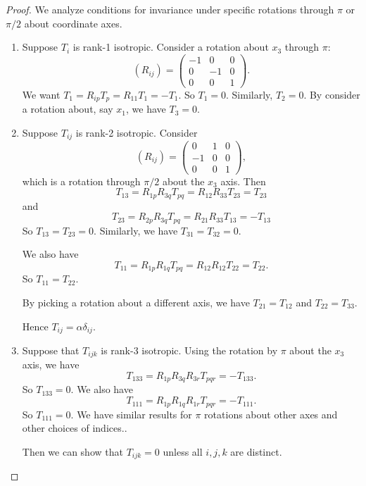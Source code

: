 \documentclass[a4paper]{article}
\begin{document}
\begin{proof}
  We analyze conditions for invariance under specific rotations through $\pi$ or $\pi/2$ about coordinate axes.

  \begin{enumerate}
    \item Suppose $T_i$ is rank-1 isotropic. Consider a rotation about $x_3$ through $\pi$:
      \[
        (R_{ij}) = 
        \begin{pmatrix}
          -1 & 0 & 0\\
          0 & -1 & 0\\
          0 & 0 & 1
        \end{pmatrix}.
      \]
      We want $T_1 = R_{ip}T_p = R_{11} T_1 = -T_1$. So $T_1 = 0$. Similarly, $T_2 = 0$. By consider a rotation about, say $x_1$, we have $T_3 = 0$.
    \item Suppose $T_{ij}$ is rank-2 isotropic. Consider
      \[
        (R_{ij}) = 
        \begin{pmatrix}
          0 & 1 & 0\\
          -1 & 0 & 0\\
          0 & 0 & 1
        \end{pmatrix},
      \]
      which is a rotation through $\pi/2$ about the $x_3$ axis. Then
      \[
        T_{13} = R_{1p}R_{3q} T_{pq} = R_{12}R_{33}T_{23} = T_{23}
      \]
      and
      \[
        T_{23} = R_{2p}R_{3q} T_{pq} = R_{21}R_{33}T_{13} = -T_{13}
      \]
      So $T_{13} = T_{23} = 0$. Similarly, we have $T_{31} = T_{32} = 0$.

      We also have
      \[
        T_{11} = R_{1p} R_{1q} T_{pq} = R_{12} R_{12}T_{22} = T_{22}.
      \]
      So $T_{11} = T_{22}$.

      By picking a rotation about a different axis, we have $T_{21} = T_{12}$ and $T_{22} = T_{33}$.

      Hence $T_{ij} = \alpha \delta_{ij}$.

    \item Suppose that $T_{ijk}$ is rank-3 isotropic. Using the rotation by $\pi$ about the $x_3$ axis, we have
      \[
        T_{133} = R_{1p}R_{3q}R_{3r}T_{pqr} = -T_{133}.
      \]
      So $T_{133} = 0$. We also have
      \[
        T_{111} = R_{1p}R_{1q}R_{1r}T_{pqr} = -T_{111}.
      \]
      So $T_{111} = 0$. We have similar results for $\pi$ rotations about other axes and other choices of indices..

      Then we can show that $T_{ijk} = 0$ unless all $i, j, k$ are distinct.


\end{enumerate}
\end{proof}
\end{document}
